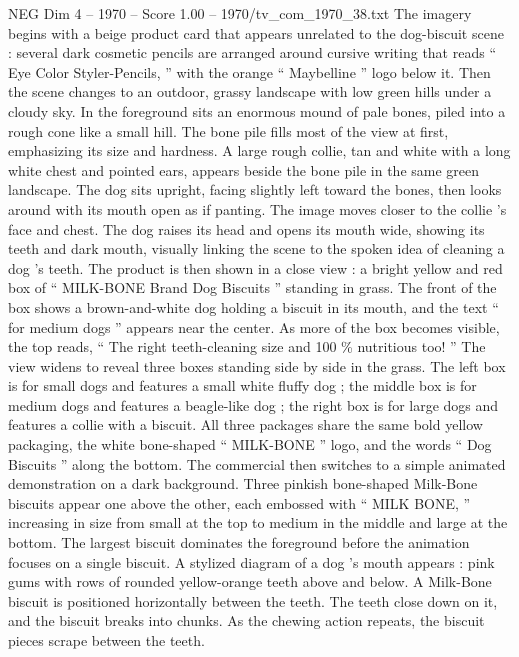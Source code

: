 \begin{textsample}{NEG Dim 4 – 1970 – Score 1.00 – 1970/tv\_com\_1970\_38.txt}  \label{ex:f4_neg_005}
The imagery begins with a beige product card that appears unrelated to the dog-biscuit scene : several dark cosmetic pencils are arranged around cursive writing that reads “ Eye Color Styler-Pencils, ” with the orange “ Maybelline ” logo below it.
Then the scene changes to an outdoor, grassy landscape with low green hills under a cloudy sky.
In the foreground sits an enormous mound of pale bones, piled into a rough cone like a small hill.
The bone pile fills most of the view at first, emphasizing its size and hardness.
A large rough collie, tan and white with a long white chest and pointed ears, appears beside the bone pile in the same green landscape.
The dog sits upright, facing slightly left toward the bones, then looks around with its mouth open as if panting.
The image moves closer to the collie ’s face and chest.
The dog raises its head and opens its mouth wide, showing its teeth and dark mouth, visually linking the scene to the spoken idea of cleaning a dog ’s teeth.
The product is then shown in a close view : a bright yellow and red box of “ MILK-BONE Brand Dog Biscuits ” standing in grass.
The front of the box shows a brown-and-white dog holding a biscuit in its mouth, and the text “ for medium dogs ” appears near the center.
As more of the box becomes visible, the top reads, “ The right teeth-cleaning size and 100 \% nutritious too! ” The view widens to reveal three boxes standing side by side in the grass.
The left box is for small dogs and features a small white fluffy dog ; the middle box is for medium dogs and features a beagle-like dog ; the right box is for large dogs and features a collie with a biscuit.
All three packages share the same bold yellow packaging, the white bone-shaped “ MILK-BONE ” logo, and the words “ Dog Biscuits ” along the bottom.
The commercial then switches to a simple animated demonstration on a dark background.
Three pinkish bone-shaped Milk-Bone biscuits appear one above the other, each embossed with “ MILK BONE, ” increasing in size from small at the top to medium in the middle and large at the bottom.
The largest biscuit dominates the foreground before the animation focuses on a single biscuit.
A stylized diagram of a dog ’s mouth appears : pink gums with rows of rounded yellow-orange teeth above and below.
A Milk-Bone biscuit is positioned horizontally between the teeth.
The teeth close down on it, and the biscuit breaks into chunks.
As the chewing action repeats, the biscuit pieces scrape between the teeth.

\end{textsample}
